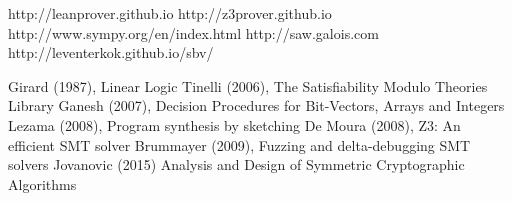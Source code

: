 \documentclass{beamer}
\begin{document}
\begin{frame}
http://leanprover.github.io\newline\newline
http://z3prover.github.io\newline\newline
http://www.sympy.org/en/index.html\newline\newline
http://saw.galois.com\newline\newline
http://leventerkok.github.io/sbv/
\end{frame}

\begin{frame}
Girard (1987), Linear Logic\newline
Tinelli (2006), The Satisfiability Modulo Theories Library\newline
Ganesh (2007), Decision Procedures for Bit-Vectors, Arrays and Integers\newline
Lezama (2008), Program synthesis by sketching\newline
De Moura (2008), Z3: An efficient SMT solver\newline
Brummayer (2009), Fuzzing and delta-debugging SMT solvers\newline
Jovanovic (2015) Analysis and Design of Symmetric Cryptographic Algorithms 
\end{frame}














%
\end{document}
